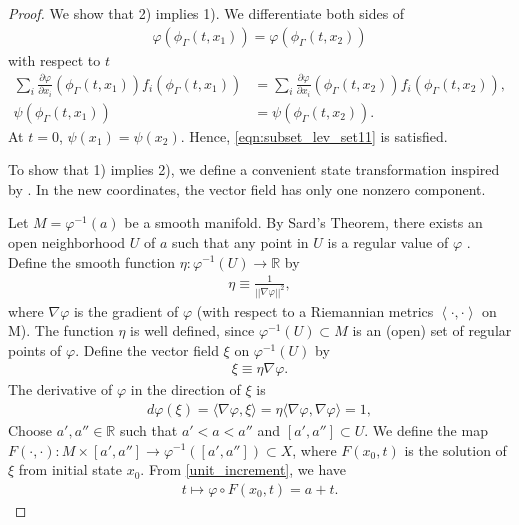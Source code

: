 \begin{proof}
We show that 2) implies 1).
We differentiate both sides of
\begin{align*}
\varphi(\phi_{\Gamma}(t,x_{1}))=\varphi(\phi_{\Gamma}(t,x_{2}))
\end{align*}
with respect to $t$
\begin{subequations}
\begin{align}
\sum_{i}\frac{\partial\varphi}{\partial x_{i}}(\phi_{\Gamma}(t,x_{1}))f_{i}(\phi_{\Gamma}(t,x_{1}))&=
\sum_{i}\frac{\partial\varphi}{\partial x_{i}}(\phi_{\Gamma}(t,x_{2}))f_{i}(\phi_{\Gamma}(t,x_{2})),\\
\psi(\phi_{\Gamma}(t,x_{1}))&=\psi(\phi_{\Gamma}(t,x_{2})).
\end{align}
\end{subequations}
At $t=0$, $\psi(x_{1})=\psi(x_{2})$. Hence, \eqref{eqn:subset_lev_set11} is satisfied.

To show that 1) implies 2), we define a convenient state transformation inspired by \cite[p.~13]{Morse_Theory_book}. In the new coordinates, the vector field has only one nonzero component.

Let $M=\varphi^{-1}(a)$ be a smooth manifold. By Sard's Theorem, there exists an open neighborhood $U$ of $a$ such that any point in $U$ is a regular value of $\varphi$ \cite[p.~132]{Introduction_to_Smooth_Manifolds}. Define the smooth function $\eta:\varphi^{-1}(U) \rightarrow \mathds{R}$ by
\begin{align}
\eta \equiv \frac{1}{||\nabla\varphi||^2},
\end{align}
where $\nabla\varphi$ is the gradient of $\varphi$ (with respect to a Riemannian metrics $\left<\cdot, \cdot \right>$ on M). The function $\eta$ is well defined, since $\varphi^{-1}(U) \subset M$ is an (open) set of regular points of $\varphi$. Define the vector field $\xi$ on $\varphi^{-1}(U)$ by
\begin{align}
\xi \equiv \eta \nabla \varphi.
\end{align}
The derivative of $\varphi$ in the direction of $\xi$ is
\begin{align}
d \varphi(\xi)=\langle\nabla\varphi,\xi\rangle=\eta\langle\nabla\varphi,\nabla\varphi\rangle=1,
\label{unit_increment}
\end{align}
Choose $a', a'' \in \mathds R$ such that $a'<a<a''$ and $[a',a'']\subset U$. We define the map $F(\cdot,\cdot):M\times[a',a'']\rightarrow\varphi^{-1}([a',a'']) \subset X$, where $F(x_{0},t)$ is the solution of $\xi$ from initial state $x_{0}$. From \eqref{unit_increment}, we have
\begin{align}
t\mapsto\varphi\circ F(x_{0},t)=a+t.\label{eqn:good_map}
\end{align}


\end{proof}
